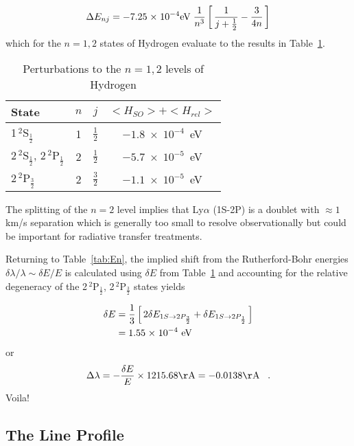 \documentclass[graybox]{svmult}
\def\ohf{\frac{1}{2}}
\def\ltk{\left [ \,}
\def\rtk{\, \right  ] }
\def\sci#1{{\; \times \; 10^{#1}}}
\def\rhf{\frac{3}{2}}
\def\perd{\;\;\; .}
\begin{document}
\begin{equation}
\Delta E_{nj} = -7.25 \sci{-4} {\rm eV} \; \frac{1}{n^3} 
   \ltk \frac{1}{j+\ohf} - \frac{3}{4n} \rtk
\end{equation}
which for the $n=1,2$ states of Hydrogen evaluate to
the results in Table~\ref{tab:Enshift}.

\begin{table}
\label{tab:Enshift}
\caption{Perturbations to the $n=1,2$ levels of Hydrogen}
\begin{center}
\begin{tabular}{lccc}
\hline
State & $n$ & $j$ & $<H_{SO}> + <H_{rel}>$ \\
\hline
1\,$^2$S$_{\ohf}$ & 1 & $\ohf$ & $-1.8 \sci{-4}$~eV \\
2\,$^2$S$_{\ohf}$, 2\,$^2$P$_\ohf$ & 2 & $\ohf$ & $-5.7 \sci{-5}$~eV \\
2\,$^2$P$_\rhf$ & 2 & $\rhf$ & $-1.1 \sci{-5}$~eV \\
\hline
\end{tabular}
\end{center}
\end{table}

The splitting of the $n=2$ level implies that
Ly$\alpha$ (1S-2P) is a doublet with $\approx 1$km/s separation
which is generally too small to resolve observationally
but could be important for radiative transfer treatments.

Returning to Table~\ref{tab:En}, the implied
shift from the Rutherford-Bohr energies
$\delta\lambda/\lambda \sim \delta E/E$
is calculated using $\delta E$ from Table~\ref{tab:Enshift}
and accounting for the relative degeneracy of the 
2\,$^2$P$_\ohf$, 2\,$^2$P$_\rhf$ states
yields

\begin{align}
\delta E &= \frac{1}{3} \ltk 2\delta E_{1S \to 2P_\rhf} + \delta E_{1S \to 2P_\ohf}
   \rtk \\
         &= 1.55 \sci{-4}~{\rm eV}
\end{align}
or
\begin{equation}
\Delta \lambda = -\frac{\delta E}{E} \times 1215.68 {\rm \AA} = -0.0138 {\rm \AA} \perd
\end{equation}
Voila!

\subsection{The Line Profile}
\end{document}
